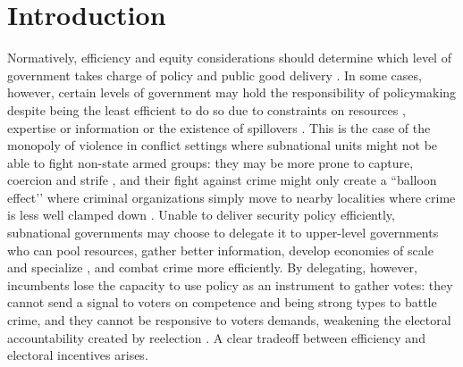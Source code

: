 
\section{Introduction}
      
                    
Normatively, efficiency and equity considerations should determine which level of government takes charge of policy and public good delivery \citep{oates_1972, Musgrave_1959, Musgrave_1983, gramlich_1977}. In some cases, however, certain levels of government may hold the responsibility of policymaking despite being the least efficient to do so due to constraints on resources \citep{Moravcsik_2000}, expertise or information \citep{Rodrick_1996} or the existence of spillovers \citep{oates_1972,  Besley_case_1995}. This is the case of the monopoly of violence in conflict settings where subnational units might not be able to fight non-state armed groups: they may be more prone to capture, coercion and strife \citep{chacon_2018}, and their fight against crime might only create a ``balloon effect’’ where criminal organizations simply move to nearby localities where crime is less well clamped down \citep{shirk_wallman_2015}. Unable to deliver security policy efficiently, subnational governments may choose to delegate it to upper-level governments who can pool resources, gather better information, develop economies of scale and specialize \citep{Hawkins_etal_2006}, and combat crime more efficiently. By delegating, however, incumbents lose the capacity to use policy as an instrument to gather votes: they cannot send a signal to voters on competence and being strong types to battle crime, and they cannot be responsive to voters demands, weakening the electoral accountability created by reelection \citep{cox_katz_2002}. A clear tradeoff between efficiency and electoral incentives arises.    
     
